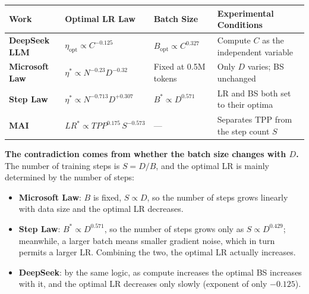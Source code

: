 \documentclass[
  english,
  11pt,
  a4paper,
]{article}
\newcounter{none} %
\providecommand{\tightlist}{%
  \setlength{\itemsep}{0pt}\setlength{\parskip}{0pt}}
\begin{document}
{\def\LTcaptype{none} %
\begin{longtable}[]{@{}
  >{\centering\arraybackslash}p{}
  >{\centering\arraybackslash}p{}
  >{\centering\arraybackslash}p{}
  >{\centering\arraybackslash}p{}@{}}
\toprule\noalign{}
\begin{minipage}[b]{\linewidth}\centering
\textbf{Work}
\end{minipage} & \begin{minipage}[b]{\linewidth}\centering
\textbf{Optimal LR Law}
\end{minipage} & \begin{minipage}[b]{\linewidth}\centering
\textbf{Batch Size}
\end{minipage} & \begin{minipage}[b]{\linewidth}\centering
\textbf{Experimental Conditions}
\end{minipage} \\
\midrule\noalign{}
\endhead
\bottomrule\noalign{}
\endlastfoot
\textbf{DeepSeek LLM} & \(\eta_{\mathrm{opt}}\propto C^{-0.125}\) &
\(B_{\mathrm{opt}}\propto C^{0.327}\) & Compute \(C\) as the independent
variable \\
\textbf{Microsoft Law} & \(\eta^*\propto N^{-0.23}D^{-0.32}\) & Fixed at
0.5M tokens & Only \(D\) varies; BS unchanged \\
\textbf{Step Law} & \(\eta^*\propto N^{-0.713}D^{+0.307}\) &
\(B^*\propto D^{0.571}\) & LR and BS both set to their optima \\
\textbf{MAI} & \(LR^*\propto TPP^{0.175}\,S^{-0.573}\) & --- & Separates
TPP from the step count \(S\) \\
\end{longtable}
}

\textbf{The contradiction comes from whether the batch size changes with
\(D\).} The number of training steps is \(S=D/B\), and the optimal LR is
mainly determined by the number of steps:

\begin{itemize}
\tightlist
\item
  \textbf{Microsoft Law}: \(B\) is fixed, \(S\propto D\), so the number
  of steps grows linearly with data size and the optimal LR decreases.
\item
  \textbf{Step Law}: \(B^*\propto D^{0.571}\), so the number of steps
  grows only as \(S\propto D^{0.429}\); meanwhile, a larger batch means
  smaller gradient noise, which in turn permits a larger LR. Combining
  the two, the optimal LR actually increases.
\item
  \textbf{DeepSeek}: by the same logic, as compute increases the optimal
  BS increases with it, and the optimal LR decreases only slowly
  (exponent of only \(-0.125\)).
\end{itemize}
\end{document}
